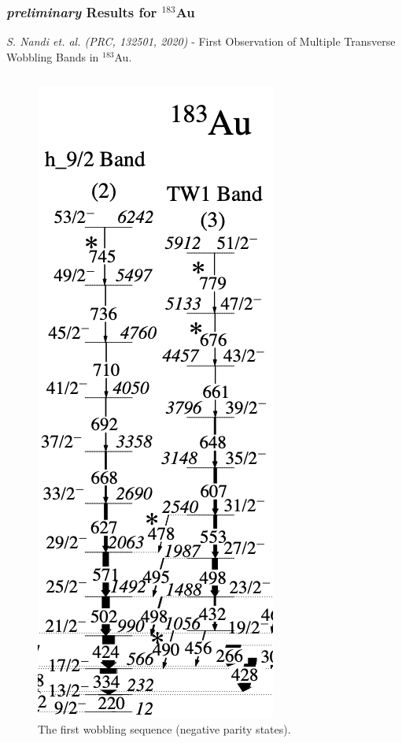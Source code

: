 \documentclass{beamer}
\begin{document}
\begin{frame}
    \frametitle{{\footnotesize \emph{preliminary}} Results for $^{183}$Au}
\textit{S. Nandi et. al. (PRC, 132501, 2020)} - First Observation of Multiple Transverse Wobbling Bands in $^{183}$Au.
    \begin{columns}[c] 
     \begin{figure}
         \centering
         \includegraphics[scale=0.15]{figs/negative_Au183.png}
         \caption{The first wobbling sequence (negative parity states).}
         \label{au183negative}
     \end{figure}
     \begin{figure}

\end{figure}
\end{columns}
\end{frame}
\end{document}
